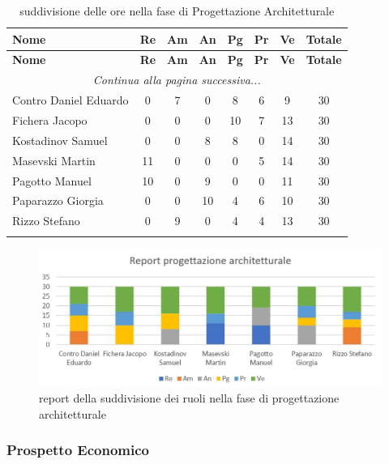 \documentclass[../piano_di_progetto.tex]{subfiles}
\begin{document}
\begin{center}
	\begin{longtable}{|l|c|c|c|c|c|c|c|}
		\hline
		\rowcolor{lightgray}
		\textbf{Nome} & \textbf{Re} & \textbf{Am} & \textbf{An} & \textbf{Pg}  & \textbf{Pr}   & \textbf{Ve} & \textbf{Totale} \\

		\hline
		\endfirsthead
	
	\hline
	\rowcolor{lightgray}
	\textbf{Nome} & \textbf{Re} & \textbf{Am} & \textbf{An} & \textbf{Pg}  & \textbf{Pr}   & \textbf{Ve} & \textbf{Totale} \\
	\hline
	\endhead
	
	\hline
	\multicolumn{8}{|c|}{\emph{Continua alla pagina successiva...}}\\
	\hline
	\endfoot

	\endlastfoot
			Contro Daniel Eduardo & 0 & 7 & 0 & 8 & 6 & 9 & 30\\
			Fichera Jacopo & 0 & 0 & 0 & 10 & 7 & 13 & 30 \\
			Kostadinov Samuel & 0 & 0 & 8 & 8 & 0 & 14 & 30 \\			
			Masevski Martin 	& 11 & 0 & 0 & 0 & 5 & 14 & 30\\
			Pagotto Manuel & 10 & 0 & 9 & 0 & 0 & 11 & 30 \\			
			Paparazzo Giorgia & 0 & 0 & 10 & 4 & 6 & 10 & 30 \\
			Rizzo Stefano & 0 & 9 & 0 & 4 & 4 & 13 & 30\\
		\hline	
		\rowcolor{white}
		\caption{suddivisione delle ore nella fase di Progettazione Architetturale}
	\end{longtable}
\end{center}

\begin{figure}[H]
\centering
\includegraphics[width=12cm]{componenti/img/report_prog_arc}
\caption{report della suddivisione dei ruoli nella fase di progettazione architetturale}
\end{figure}

\subsubsection{Prospetto Economico}
\end{document}
